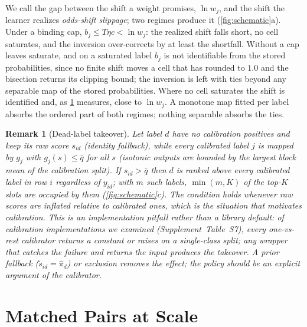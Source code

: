 \documentclass[sigconf,nonacm]{acmart}
\newtheorem{remark}{Remark}
\newcommand{\Supp}[1]{Supplement~#1}  %
\begin{document}
We call the gap between the shift a weight promises, $\ln w_j$, and the shift the learner realizes \emph{odds-shift slippage}; two regimes produce it (\cref{fig:schematic}a). Under a binding cap, $b_j\le T\eta c<\ln w_j$: the realized shift falls short, no cell saturates, and the inversion over-corrects by at least the shortfall. Without a cap leaves saturate, and on a saturated label $b_j$ is not identifiable from the stored probabilities, since no finite shift moves a cell that has rounded to $1.0$ and the bisection returns its clipping bound; the inversion is left with ties beyond any separable map of the stored probabilities. Where no cell saturates the shift is identified and, as \cref{sec:santander} measures, close to $\ln w_j$. A monotone map fitted per label absorbs the ordered part of both regimes; nothing separable absorbs the ties.

\begin{remark}[Dead-label takeover]
\label{prop:dead}
Let label $d$ have no calibration positives and keep its raw score $s_{id}$ (identity fallback), while every calibrated label $j$ is mapped by $g_j$ with $g_j(s)\le\bar q$ for all $s$ (isotonic outputs are bounded by the largest block mean of the calibration split). If $s_{id}>\bar q$ then $d$ is ranked above every calibrated label in row $i$ regardless of $y_{id}$; with $m$ such labels, $\min(m,K)$ of the top-$K$ slots are occupied by them (\cref{fig:schematic}c). The condition holds whenever raw scores are inflated relative to calibrated ones, which is the situation that motivates calibration. This is an implementation pitfall rather than a library default: of \nnSurveyImpl{} calibration implementations we examined (\Supp{Table~S7}), every one-vs-rest calibrator returns a constant or raises on a single-class split; any wrapper that catches the failure and returns the input produces the takeover. A prior fallback ($\tilde s_{id}=\hat\pi_d$) or exclusion removes the effect; the policy should be an explicit argument of the calibrator.
\end{remark}

\section{Matched Pairs at Scale}
\label{sec:santander}
\end{document}
